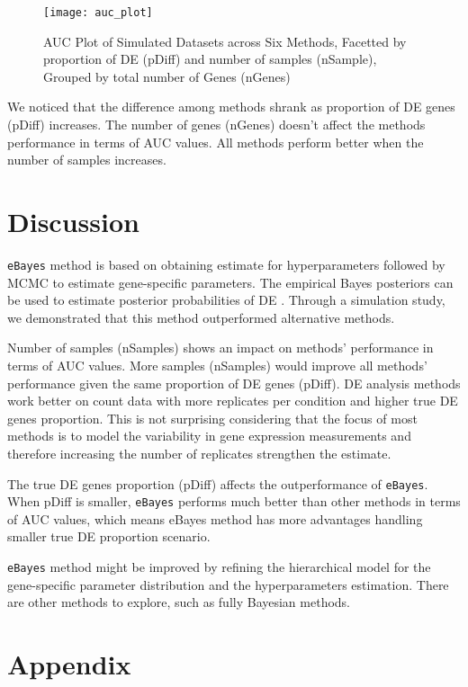 \begin{figure}[h!tb] 
\texttt{[image: auc\_plot]}
\caption{AUC Plot of Simulated Datasets across Six Methods, Facetted by proportion of DE (pDiff) and number of samples (nSample), Grouped by total number of Genes (nGenes)}
\label{auc}
\end{figure}

We noticed that the difference among methods shrank as proportion of DE genes (pDiff) increases. The number of genes (nGenes) doesn't affect the methods performance in terms of AUC values. All methods perform better when the number of samples increases.


\section{Discussion}

{\tt eBayes} method is based on obtaining estimate for hyperparameters followed by MCMC to estimate gene-specific parameters. The empirical Bayes posteriors can be used to estimate posterior probabilities of DE . Through a simulation study, we demonstrated that this method outperformed alternative methods. 

Number of samples (nSamples) shows an impact on methods' performance in terms of AUC values. More samples (nSamples) would improve all methods' performance given the same proportion of DE genes (pDiff). DE analysis methods work better on count data with more replicates per condition and higher true DE genes proportion. This is not surprising considering that the focus of most methods is to model the variability in gene expression measurements and therefore increasing the number of replicates strengthen the estimate. 

The true DE genes proportion (pDiff) affects the outperformance of {\tt eBayes}. When pDiff is smaller, {\tt eBayes} performs much better than other methods in terms of AUC values, which means eBayes method has more advantages handling smaller true DE proportion scenario.

{\tt eBayes} method might be improved by refining the hierarchical model for the gene-specific parameter distribution and the hyperparameters estimation. There are other methods to explore, such as fully Bayesian methods. 



\section{Appendix}

